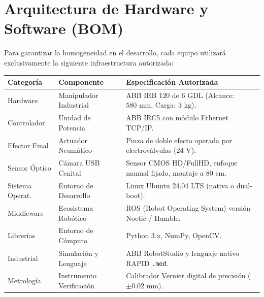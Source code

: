 \documentclass[11pt,a4paper]{article}
\begin{document}
\section{Arquitectura de Hardware y Software (BOM)}
Para garantizar la homogeneidad en el desarrollo, cada equipo utilizará exclusivamente la siguiente infraestructura autorizada:

\vspace{0.3cm}
\noindent
\begin{tabularx}{\textwidth}{@{} l l X @{}}
\toprule
\textbf{Categoría} & \textbf{Componente} & \textbf{Especificación Autorizada} \\
\midrule
Hardware & Manipulador Industrial & ABB IRB 120 de 6 GDL (Alcance: $580\text{ mm}$, Carga: $3\text{ kg}$). \\
Controlador & Unidad de Potencia & ABB IRC5 con módulo Ethernet TCP/IP. \\
Efector Final & Actuador Neumático & Pinza de doble efecto operada por electroválvulas (24 V). \\
Sensor Óptico & Cámara USB Cenital & Sensor CMOS HD/FullHD, enfoque manual fijado, montaje a $80\text{ cm}$. \\
Sistema Operat. & Entorno de Desarrollo & Linux Ubuntu 24.04 LTS (nativa o dual-boot). \\
Middleware & Ecosistema Robótico & ROS (Robot Operating System) versión Noetic / Humble. \\
Librerías & Entorno de Cómputo & Python 3.x, NumPy, OpenCV. \\
Industrial & Simulación y Lenguaje & ABB RobotStudio y lenguaje nativo RAPID \texttt{.mod}. \\
Metrología & Instrumento Verificación & Calibrador Vernier digital de precisión ($\pm 0.02\text{ mm}$). \\
\bottomrule
\end{tabularx}
\end{document}
